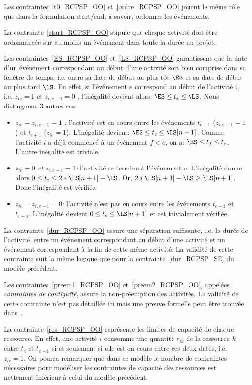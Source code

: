 Les contraintes~\eqref{t0_RCPSP_OO} et~\eqref{ordre_RCPSP_OO} jouent
le même rôle que dans la formulation start/end, à savoir, ordonner
les événements.

La contrainte~\eqref{start_RCPSP_OO} stipule que chaque activité
doit être ordonnancée sur au moins un événement dans toute la durée du projet.
 
Les contraintes~\eqref{ES_RCPSP_OO} et~\eqref{LS_RCPSP_OO}
garantissent que la date d'un événement correspondant au début
d'une activité soit bien comprise dans sa fenêtre de temps, i.e.
entre sa date de début au plus tôt $\ES$ et sa date de début au
plus tard $\LS$. En effet, si l'événement $e$ correspond au début
de l'activité $i$, i.e. $z_{ie}=1$ et $z_{i,e-1}=0$ , l'inégalité
devient alors: $\ES \le t_e \le \LS$. Nous distinguons 3 autres
cas: \begin{itemize} \item {\it $z_{ie}=z_{i,e-1}=1$ :} l'activité
est en cours entre les événements $t_{e-1}$ ($z_{i,e-1}=1$) et
$t_{e+1}$ ($z_{ie}=1$). L'inégalité devient: $\ES\le t_e \le
\LS[n+1]$. Comme l'activité $i$ a déjà commencé à un événement $f
<e$, on a: $\ES \le t_f \le t_e$. L'autre inégalité est triviale.
\item {\it$z_{ie}=0$ et $z_{i,e-1}=1$:} l'activité se termine à
l'événement $e$. L'inégalité donne alors $0 \le t_e \le
2*\LS[n+1]-\LS$. Or, $2*\LS[n+1] -\LS \ge \LS[n+1]$. Donc
l'inégalité est vérifiée. \item {\it $z_{ie}=z_{i,e-1}=0$:}
l'activité n'est pas en cours entre les événements $t_{e-1}$ et
$t_{e+1}$. L'inégalité devient $0 \le t_e \le \LS[n+1]$ et est
trivialement vérifiée. \end{itemize}

La contrainte~\eqref{dur_RCPSP_OO} assure une séparation
suffisante, i.e. la durée de l'activité, entre un événement
correspondant au début d'une activité et un événement
correspondant à la fin de cette même activité. La validité de
cette contrainte suit la même logique que pour la
contrainte~\eqref{dur_RCPSP_SE} du modèle précédent.

Les contraintes~\eqref{preem1_RCPSP_OO}
et~\eqref{preem2_RCPSP_OO}, appelées {\it contraintes de
contiguïté}, assure la non-préemption des activités. La validité
de cette contrainte n'est pas détaillée ici mais une preuve
formelle peut être trouvée dans~\cite{modele_RCPSP}.

La contrainte~\eqref{res_RCPSP_OO} représente les limites de
capacité de chaque ressource. En effet, une activité $i$ consomme
une quantité $r_{ik}$ de la ressource $k$ entre $t_e$ et $t_{e+1}$
si et seulement si elle est en cours entre ces deux dates, i.e.
$z_{ie}=1$. On pourra remarquer que dans ce modèle le nombre de
contraintes nécessaires pour modéliser les contraintes de capacité
des ressources est nettement inférieur à celui du modèle précédent.

